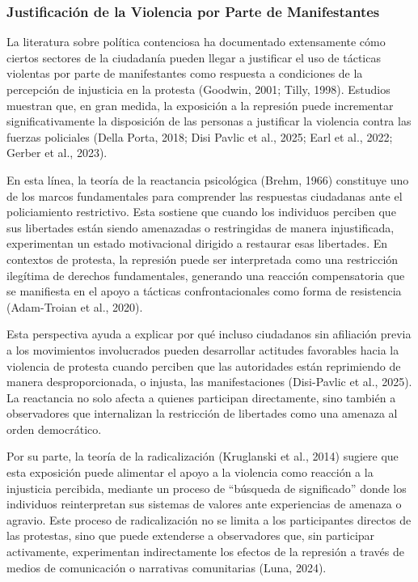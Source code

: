\documentclass[
  13pt,
]{article}
\begin{document}
\subsubsection{Justificación de la Violencia por Parte de
Manifestantes}\label{justificaciuxf3n-de-la-violencia-por-parte-de-manifestantes}

La literatura sobre política contenciosa ha documentado extensamente
cómo ciertos sectores de la ciudadanía pueden llegar a justificar el uso
de tácticas violentas por parte de manifestantes como respuesta a
condiciones de la percepción de injusticia en la protesta (Goodwin,
2001; Tilly, 1998). Estudios muestran que, en gran medida, la exposición
a la represión puede incrementar significativamente la disposición de
las personas a justificar la violencia contra las fuerzas policiales
(Della Porta, 2018; Disi Pavlic et al., 2025; Earl et al., 2022; Gerber
et al., 2023).

En esta línea, la teoría de la reactancia psicológica (Brehm, 1966)
constituye uno de los marcos fundamentales para comprender las
respuestas ciudadanas ante el policiamiento restrictivo. Esta sostiene
que cuando los individuos perciben que sus libertades están siendo
amenazadas o restringidas de manera injustificada, experimentan un
estado motivacional dirigido a restaurar esas libertades. En contextos
de protesta, la represión puede ser interpretada como una restricción
ilegítima de derechos fundamentales, generando una reacción
compensatoria que se manifiesta en el apoyo a tácticas confrontacionales
como forma de resistencia (Adam-Troian et al., 2020).

Esta perspectiva ayuda a explicar por qué incluso ciudadanos sin
afiliación previa a los movimientos involucrados pueden desarrollar
actitudes favorables hacia la violencia de protesta cuando perciben que
las autoridades están reprimiendo de manera desproporcionada, o injusta,
las manifestaciones (Disi-Pavlic et al., 2025). La reactancia no solo
afecta a quienes participan directamente, sino también a observadores
que internalizan la restricción de libertades como una amenaza al orden
democrático.

Por su parte, la teoría de la radicalización (Kruglanski et al., 2014)
sugiere que esta exposición puede alimentar el apoyo a la violencia como
reacción a la injusticia percibida, mediante un proceso de ``búsqueda de
significado'' donde los individuos reinterpretan sus sistemas de valores
ante experiencias de amenaza o agravio. Este proceso de radicalización
no se limita a los participantes directos de las protestas, sino que
puede extenderse a observadores que, sin participar activamente,
experimentan indirectamente los efectos de la represión a través de
medios de comunicación o narrativas comunitarias (Luna, 2024).
\end{document}
